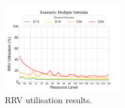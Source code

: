 \documentclass[preprint,12pt]{elsarticle}
\begin{document}
\begin{figure}
\begin{center}
\includegraphics[width=0.45\textwidth]{img/plots/multiple_RRVUtilisation}
\end{center}
\caption{RRV utilisation results.}
\label{fig:results_rrv_utilisation_multiple}
\end{figure}
\end{document}
